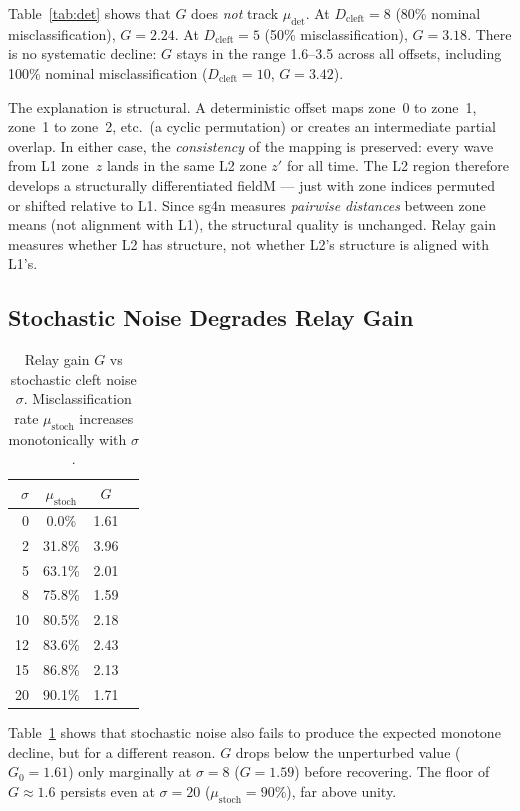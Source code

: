 \documentclass[11pt]{article}
\begin{document}
Table~\ref{tab:det} shows that $G$ does \emph{not} track
$\mu_\mathrm{det}$.
At $D_\mathrm{cleft} = 8$ (80\% nominal misclassification), $G = 2.24$.
At $D_\mathrm{cleft} = 5$ (50\% misclassification), $G = 3.18$.
There is no systematic decline: $G$ stays in the range 1.6--3.5
across all offsets, including 100\% nominal misclassification
($D_\mathrm{cleft} = 10$, $G = 3.42$).

The explanation is structural.
A deterministic offset maps zone~0 to zone~1, zone~1 to zone~2, etc.\
(a cyclic permutation) or creates an intermediate partial overlap.
In either case, the \emph{consistency} of the mapping is preserved:
every wave from L1 zone~$z$ lands in the same L2 zone $z'$ for all
time.
The L2 region therefore develops a structurally differentiated fieldM
--- just with zone indices permuted or shifted relative to L1.
Since sg4n measures \emph{pairwise distances} between zone means
(not alignment with L1), the structural quality is unchanged.
Relay gain measures whether L2 has structure, not whether L2's
structure is aligned with L1's.

\subsection{Stochastic Noise Degrades Relay Gain}

\begin{table}[h]
  \centering
  \caption{Relay gain $G$ vs stochastic cleft noise $\sigma$.
           Misclassification rate $\mu_\mathrm{stoch}$ increases
           monotonically with $\sigma$.}
  \label{tab:stoch}
  \small
  \begin{tabular}{rccc}
    \toprule
    $\sigma$ & $\mu_\mathrm{stoch}$ & $G$ \\
    \midrule
     0  &   0.0\% & 1.61 \\
     2  &  31.8\% & 3.96 \\
     5  &  63.1\% & 2.01 \\
     8  &  75.8\% & 1.59 \\
    10  &  80.5\% & 2.18 \\
    12  &  83.6\% & 2.43 \\
    15  &  86.8\% & 2.13 \\
    20  &  90.1\% & 1.71 \\
    \bottomrule
  \end{tabular}
\end{table}

Table~\ref{tab:stoch} shows that stochastic noise also fails to produce
the expected monotone decline, but for a different reason.
$G$ drops below the unperturbed value ($G_0 = 1.61$) only marginally
at $\sigma = 8$ ($G = 1.59$) before recovering.
The floor of $G \approx 1.6$ persists even at $\sigma = 20$
($\mu_\mathrm{stoch} = 90\%$), far above unity.
\end{document}
